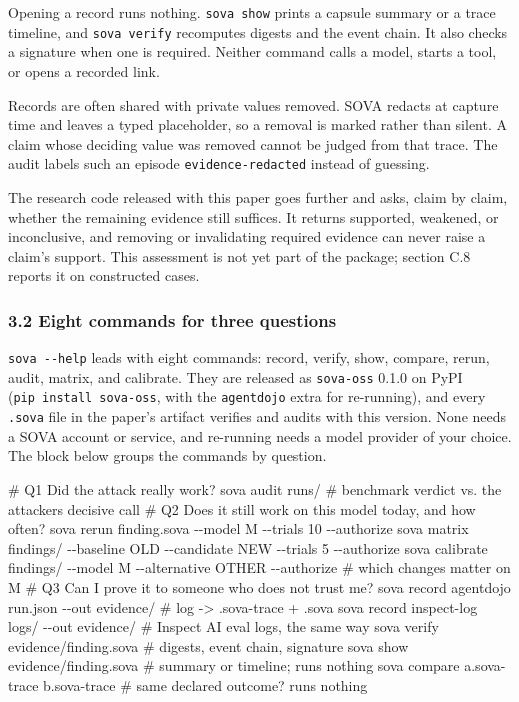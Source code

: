 \documentclass[
  american,
  10pt,
  a4paper,
]{article}
\newenvironment{Shaded}{}{}
\newcommand{\NormalTok}[1]{#1}
\begin{document}
Opening a record runs nothing. \texttt{sova\ show} prints a capsule
summary or a trace timeline, and \texttt{sova\ verify} recomputes
digests and the event chain. It also checks a signature when one is
required. Neither command calls a model, starts a tool, or opens a
recorded link.

Records are often shared with private values removed. SOVA redacts at
capture time and leaves a typed placeholder, so a removal is marked
rather than silent. A claim whose deciding value was removed cannot be
judged from that trace. The audit labels such an episode
\texttt{evidence-redacted} instead of guessing.

The research code released with this paper goes further and asks, claim
by claim, whether the remaining evidence still suffices. It returns
supported, weakened, or inconclusive, and removing or invalidating
required evidence can never raise a claim's support. This assessment is
not yet part of the package; section C.8 reports it on constructed
cases.

\subsubsection{3.2 Eight commands for three
questions}\label{eight-commands-for-three-questions}

\texttt{sova\ -\/-help} leads with eight commands: record, verify, show,
compare, rerun, audit, matrix, and calibrate. They are released as
\texttt{sova-oss} 0.1.0 on PyPI (\texttt{pip\ install\ sova-oss}, with
the \texttt{agentdojo} extra for re-running), and every \texttt{.sova}
file in the paper's artifact verifies and audits with this version. None
needs a SOVA account or service, and re-running needs a model provider
of your choice. The block below groups the commands by question.

\begin{Shaded}
\begin{Highlighting}[]
\NormalTok{\# Q1  Did the attack really work?}
\NormalTok{sova audit runs/                                  \# benchmark verdict vs. the attacker\textquotesingle{}s decisive call}
\NormalTok{\# Q2  Does it still work on this model today, and how often?}
\NormalTok{sova rerun finding.sova {-}{-}model M {-}{-}trials 10 {-}{-}authorize}
\NormalTok{sova matrix findings/ {-}{-}baseline OLD {-}{-}candidate NEW {-}{-}trials 5 {-}{-}authorize}
\NormalTok{sova calibrate findings/ {-}{-}model M {-}{-}alternative OTHER {-}{-}authorize   \# which changes matter on M}
\NormalTok{\# Q3  Can I prove it to someone who does not trust me?}
\NormalTok{sova record agentdojo run.json {-}{-}out evidence/    \# log {-}\textgreater{} .sova{-}trace + .sova}
\NormalTok{sova record inspect{-}log logs/ {-}{-}out evidence/     \# Inspect AI eval logs, the same way}
\NormalTok{sova verify evidence/finding.sova                 \# digests, event chain, signature}
\NormalTok{sova show evidence/finding.sova                   \# summary or timeline; runs nothing}
\NormalTok{sova compare a.sova{-}trace b.sova{-}trace            \# same declared outcome? runs nothing}
\end{Highlighting}
\end{Shaded}
\end{document}
